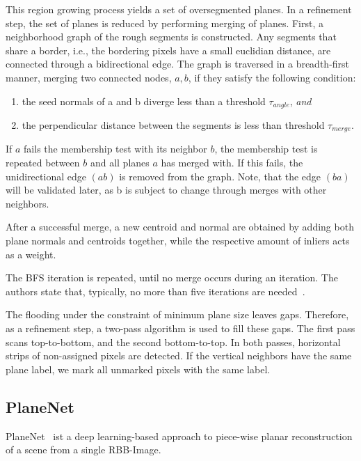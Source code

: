 \documentclass[main.tex]{subfiles}
\begin{document}
This region growing process yields a set of oversegmented planes. In a refinement step, the set of planes is reduced 
by performing merging of planes.
First, a neighborhood graph of the rough segments is constructed. Any segments that share a border, i.e., the bordering 
pixels have a small euclidian distance, are connected through a bidirectional edge.
The graph is traversed in a breadth-first manner, merging two connected nodes, $a,b$, if they satisfy the following condition:

\begin{enumerate}
    \item the seed normals of a and b diverge less than a threshold $\tau_{angle}$, \textit{and}
    \item the perpendicular distance between the segments is less than threshold $\tau_{merge}$.
\end{enumerate}
If $a$ fails the membership test with its neighbor $b$, the membership test is repeated between $b$ and all planes $a$ 
has merged with. If this fails, the unidirectional edge $(ab)$ is removed from the graph. Note, that the edge $(ba)$ will
be validated later, as b is subject to change through merges with other neighbors.

After a successful merge, a new centroid and normal are obtained by adding both plane normals and centroids together, 
while the respective amount of inliers acts as a weight.

The BFS iteration is repeated, until no merge occurs during an iteration. The authors state that, typically, no more than five
iterations are needed~\cite[Section~III.E]{Roychoudhury_Missura_Bennewitz_2021_new}.

The flooding under the constraint of minimum plane size leaves gaps. Therefore, as a refinement step, a two-pass 
algorithm is used to fill these gaps. The first pass scans top-to-bottom, and the second bottom-to-top.
In both passes, horizontal strips of non-assigned pixels are detected. If the vertical neighbors have the same plane label,
we mark all unmarked pixels with the same label.

\subsection{PlaneNet}
PlaneNet~\cite{Liu_Yang_Ceylan_Yumer_Furukawa_2018} ist a deep learning-based approach to piece-wise planar reconstruction of a scene from a single RBB-Image.
\end{document}
